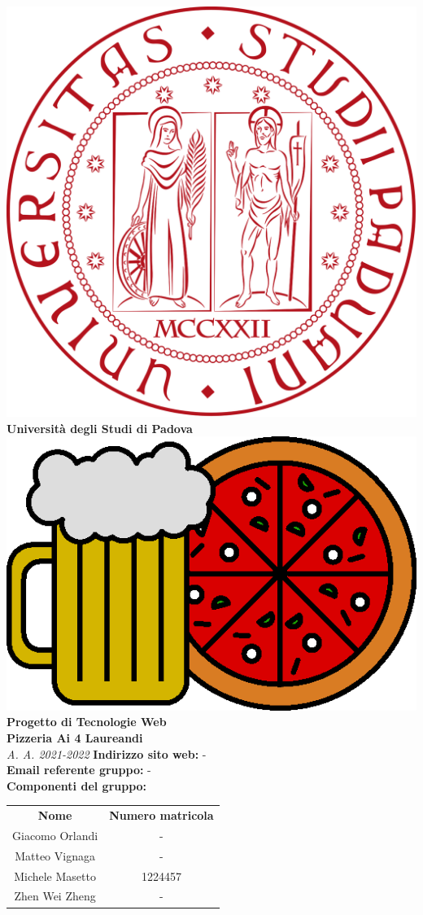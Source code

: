 \begin{center}
	\includegraphics[scale=0.05]{resources/logo_unipd.png} \\
	\bigskip
	\textbf{Università degli Studi di Padova} \\
	\vfill
	\includegraphics[scale=0.3]{resources/logo.png}
	\vfill
	\huge 
	\textbf{Progetto di Tecnologie Web \\ Pizzeria Ai 4 Laureandi} \\
	\bigskip
	\large
	\textit{A. A. 2021-2022}
	\vfill
	\textbf{Indirizzo sito web:} - \\
	\textbf{Email referente gruppo:} - \\
	\bigskip
	\bigskip
	\textbf{Componenti del gruppo:} \\
	\bigskip
	\begin{tabular}{c | c}
		\textbf{Nome} & \textbf{Numero matricola} \\
		Giacomo Orlandi & - \\
		Matteo Vignaga & - \\
		Michele Masetto & 1224457 \\
		Zhen Wei Zheng & - \\
	\end{tabular}
	\vfill
\end{center}